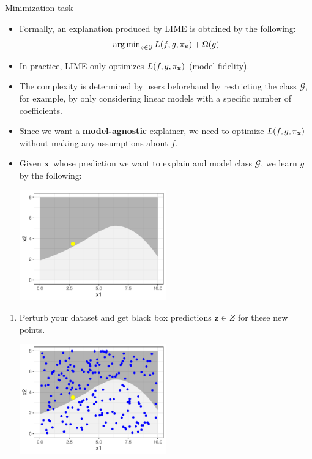 \documentclass[11pt,compress,t,notes=noshow, xcolor=table]{beamer}
\newcommand{\Gspace}{\mathcal{G}}
\newcommand{\neigh}{\pi_{\xv}}
\newcommand{\zv}{\mathbf{z}}
\begin{document}
\begin{vbframe}{Minimization task}
	\begin{itemize}
		\item Formally, an explanation produced by LIME is obtained by the following: 
		$$ \argmin_{g \in \Gspace} L(f, g, \neigh) + \Omega(g)$$
		\item In practice, LIME only optimizes $L(f, g, \neigh)$ (model-fidelity). 	
		\item The complexity is determined by users beforehand by restricting the class $\Gspace$, for example, by only considering linear models with a specific number of coefficients. 
		\framebreak 
		\item Since we want a \textbf{model-agnostic} explainer, we need to optimize $L(f, g, \neigh)$ without making any assumptions about $f$. 
		\item 	Given $\xv$ whose prediction we want to explain and model class $\Gspace$, we learn $g$ by the following: 
			\vspace{1cm}
		\begin{center}
			\includegraphics[width=0.5\textwidth]{figure/lime2}
		\end{center}
	\end{itemize}
	
		\begin{enumerate}
		\framebreak 
		\item Perturb your dataset and get black box predictions $\zv \in Z$ for these new points.
		\vspace{1cm}
		\begin{center}
			\includegraphics[width=0.5\textwidth]{figure/lime3}
		\end{center}
		

\end{enumerate}
\end{vbframe}
\end{document}
